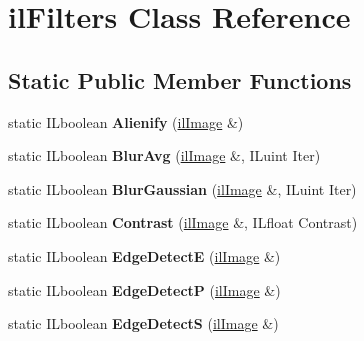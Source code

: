 \hypertarget{classil_filters}{\section{il\+Filters Class Reference}
\label{classil_filters}
}
\subsection*{Static Public Member Functions}
\begin{DoxyCompactItemize}
\item 
\hypertarget{classil_filters_ad885b4677507b4bf53ddb24d500b2901}{static I\+Lboolean {\bfseries Alienify} (\hyperlink{classil_image}{il\+Image} \&)}\label{classil_filters_ad885b4677507b4bf53ddb24d500b2901}

\item 
\hypertarget{classil_filters_a00d7a6ad191c8ea5418e038b19aed632}{static I\+Lboolean {\bfseries Blur\+Avg} (\hyperlink{classil_image}{il\+Image} \&, I\+Luint Iter)}\label{classil_filters_a00d7a6ad191c8ea5418e038b19aed632}

\item 
\hypertarget{classil_filters_ae1d81ab10cf08d7a0fa4db932a93bb08}{static I\+Lboolean {\bfseries Blur\+Gaussian} (\hyperlink{classil_image}{il\+Image} \&, I\+Luint Iter)}\label{classil_filters_ae1d81ab10cf08d7a0fa4db932a93bb08}

\item 
\hypertarget{classil_filters_a4f49e9ded30829e5e70f7e39588ee308}{static I\+Lboolean {\bfseries Contrast} (\hyperlink{classil_image}{il\+Image} \&, I\+Lfloat Contrast)}\label{classil_filters_a4f49e9ded30829e5e70f7e39588ee308}

\item 
\hypertarget{classil_filters_a8322055521f70b182c1ab7bc8dc907df}{static I\+Lboolean {\bfseries Edge\+Detect\+E} (\hyperlink{classil_image}{il\+Image} \&)}\label{classil_filters_a8322055521f70b182c1ab7bc8dc907df}

\item 
\hypertarget{classil_filters_aef519861ad2fac4bf3bde431d1b26e17}{static I\+Lboolean {\bfseries Edge\+Detect\+P} (\hyperlink{classil_image}{il\+Image} \&)}\label{classil_filters_aef519861ad2fac4bf3bde431d1b26e17}

\item 
\hypertarget{classil_filters_ac8e0f068f4bb99cadc85cc38f1474e09}{static I\+Lboolean {\bfseries Edge\+Detect\+S} (\hyperlink{classil_image}{il\+Image} \&)}\label{classil_filters_ac8e0f068f4bb99cadc85cc38f1474e09}


\end{DoxyCompactItemize}
